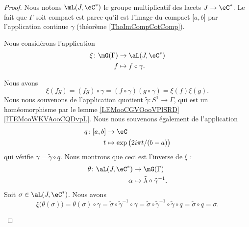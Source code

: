 \begin{proof}
	Nous notons \( \mL(J,\eC^*)\) le groupe multiplicatif des lacets \( J\to \eC^*\). Le fait que \( \Gamma\) soit compact est parce qu'il est l'image du compact \( \mathopen[ a , b \mathclose]\) par l'application continue \( \gamma\) (théorème \ref{ThoImCompCotComp}).

	Nous considérons l'application
	\begin{equation}
		\begin{aligned}
			\xi\colon \mG(\Gamma) & \to \aL(J,\eC^*)       \\
			f                     & \mapsto f\circ \gamma.
		\end{aligned}
	\end{equation}
	\begin{subproof}
		Nous avons
		\begin{equation}
			\xi(fg)=(fg)\circ \gamma=(f\circ \gamma)(g\circ \gamma)=\xi(f)\xi(g).
		\end{equation}
		Nous nous souvenons de l'application quotient \( \tilde \gamma\colon S^1\to \Gamma\), qui est un homéomorphisme par le lemme \ref{LEMooCGVOooVPlSRD}\ref{ITEMooWKVAooCQDvpL}. Nous nous souvenons également de l'application
		\begin{equation}
			\begin{aligned}
				q\colon \mathopen[ a , b \mathclose] & \to \eC                               \\
				t                                    & \mapsto \exp\big( 2i\pi t/(b-a) \big)
			\end{aligned}
		\end{equation}
		qui vérifie \( \gamma=\tilde \gamma\circ q\). Nous montrons que ceci est l'inverse de \( \xi\) :
		\begin{equation}
			\begin{aligned}
				\theta\colon \aL(J,\eC^*) & \to \mG(\Gamma)                                \\
				\alpha                    & \mapsto \tilde \lambda\circ\tilde \gamma^{-1}.
			\end{aligned}
		\end{equation}
		Soit \( \sigma\in\aL(J,\eC^*)\). Nous avons
		\begin{equation}
			\xi\big( \theta(\sigma) \big)=\theta(\sigma)\circ\gamma=\tilde \sigma\circ\tilde \gamma^{-1}\circ\gamma=\tilde \sigma\circ\tilde \gamma^{-1}\circ\tilde \gamma\circ q=\tilde \sigma\circ q=\sigma.

\end{equation}
\end{subproof}
\end{proof}
